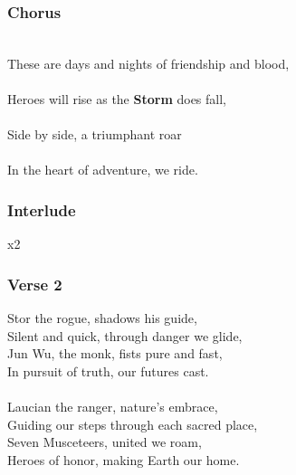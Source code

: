 \documentclass[letterpaper,openany,oneside,twocolumn]{book}
\begin{document}
\subsubsection*{Chorus}
\hspace*{1.5cm}\hspace*{0.9cm}\hspace*{1cm}\hspace*{1.8cm}\\
{\entryfont These are days and nights of friendship and blood,}\\
\hspace*{1.1cm}\hspace*{1.3cm}\hspace*{1.3cm}\\
{\entryfont Heroes will rise as the \textbf{Storm} does fall,}\\
\hspace*{0.85cm}\hspace*{0.4cm}\hspace*{1.3cm}\\
{\entryfont Side by side, a triumphant roar}\\
\hspace*{1.1cm}\hspace*{0.4cm}\hspace*{1.9cm}\\
{\entryfont In the heart of adventure, we ride.}

\subsubsection*{Interlude}
    {\footnotesize x2}

\subsubsection*{Verse 2}
{\entryfont Stor the rogue, shadows his guide,}\\
Silent and quick, through danger we glide,\\
Jun Wu, the monk, fists pure and fast,\\
In pursuit of truth, our futures cast.\\
\\
Laucian the ranger, nature's embrace,\\
Guiding our steps through each sacred place,\\
Seven Musceteers, united we roam,\\
Heroes of honor, making Earth our home.
\end{document}
